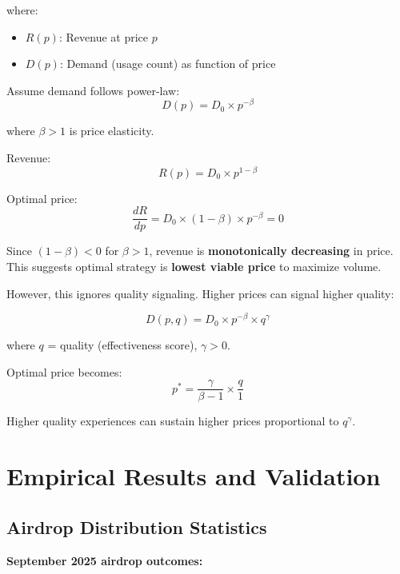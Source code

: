 \documentclass[11pt,letterpaper]{article}
\theoremstyle{definition}
\theoremstyle{remark}
\begin{document}
where:
\begin{itemize}
\item $R(p)$: Revenue at price $p$
\item $D(p)$: Demand (usage count) as function of price
\end{itemize}

Assume demand follows power-law:
\begin{equation}
D(p) = D_0 \times p^{-\beta}
\end{equation}

where $\beta > 1$ is price elasticity.

Revenue:
\begin{equation}
R(p) = D_0 \times p^{1-\beta}
\end{equation}

Optimal price:
\begin{equation}
\frac{dR}{dp} = D_0 \times (1-\beta) \times p^{-\beta} = 0
\end{equation}

Since $(1-\beta) < 0$ for $\beta > 1$, revenue is \textbf{monotonically decreasing} in price. This suggests optimal strategy is \textbf{lowest viable price} to maximize volume.

However, this ignores quality signaling. Higher prices can signal higher quality:

\begin{equation}
D(p, q) = D_0 \times p^{-\beta} \times q^{\gamma}
\end{equation}

where $q$ = quality (effectiveness score), $\gamma > 0$.

Optimal price becomes:
\begin{equation}
p^* = \frac{\gamma}{\beta - 1} \times \frac{q}{1}
\end{equation}

Higher quality experiences can sustain higher prices proportional to $q^{\gamma}$.

\section{Empirical Results and Validation}

\subsection{Airdrop Distribution Statistics}

\textbf{September 2025 airdrop outcomes:}
\end{document}
